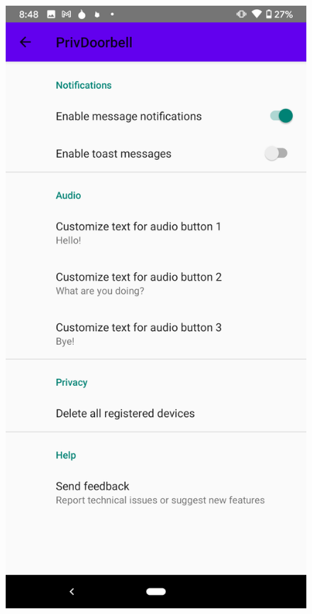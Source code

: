 \begin{figure}
	\begin{minipage}[t]{0.3\linewidth}
		\includegraphics[width=\linewidth]{app_sc_management.png}
		\label{fig:app_sc_management}
	\end{minipage}
	\begin{minipage}[t]{0.3\linewidth}

\end{minipage}
\end{figure}
